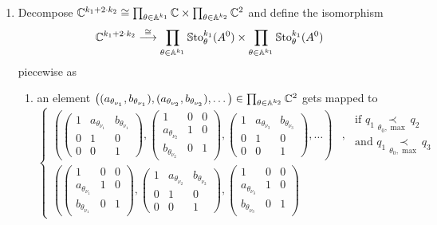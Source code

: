 \begin{enumerate}
  \item Decompose $\mathbb{C}^{k_1+2\cdot k_2}\cong
    \prod_{\theta\in\mathbb{A}^{k_1}} \mathbb{C} \times \prod_{\theta\in\mathbb{A}^{k_2}} \mathbb{C}^2$ and
    define the isomorphism
    \[
      \mathbb{C}^{k_1+2\cdot k_2}\overset{\cong}\longrightarrow
      \prod_{\theta\in\mathbb{A}^{k_1}} \operatorname{\mathbb{S}to}_{\theta}^{k_1}(A^0) \times
      \prod_{\theta\in\mathbb{A}^{k_1}} \operatorname{\mathbb{S}to}_{\theta}^{k_1}(A^0)
    \]
    piecewise as
    \begin{enumerate}
      \item an element
        $\left( (a_{\theta_{\nu_1}},b_{\theta_{\nu_1}})
          ,(a_{\theta_{\nu_2}},b_{\theta_{\nu_2}})
          ,\dots
        \right)\in\prod_{\theta\in\mathbb{A}^{k_2}} \mathbb{C}^2$
        gets mapped to
        \[
          \left.
          \begin{cases}
            \left(
            \begin{pmatrix} 1 & a_{\theta_{\nu_1}} & b_{\theta_{\nu_1}} \\0 & 1 & 0 \\0 & 0 & 1 \end{pmatrix}
            ,\begin{pmatrix} 1 & 0 & 0 \\a_{\theta_{\nu_2}} & 1 & 0 \\b_{\theta_{\nu_2}} & 0 & 1 \end{pmatrix}
            ,\begin{pmatrix} 1 & a_{\theta_{\nu_3}} & b_{\theta_{\nu_3}} \\0 & 1 & 0 \\0 & 0 & 1 \end{pmatrix}
              ,\dots
            \right)
            & ,\substack{\text{~if~} q_1 \underset{\theta_0,\max}{\prec} q_2
              \\\text{~and~} q_1 \underset{\theta_0,\max}{\prec} q_3}
            \\\left(
            \begin{pmatrix} 1 & 0 & 0 \\a_{\theta_{\nu_1}} & 1 & 0 \\b_{\theta_{\nu_1}} & 0 & 1 \end{pmatrix}
            ,\begin{pmatrix} 1 & a_{\theta_{\nu_2}} & b_{\theta_{\nu_2}} \\0 & 1 & 0 \\0 & 0 & 1 \end{pmatrix}
            ,\begin{pmatrix} 1 & 0 & 0 \\a_{\theta_{\nu_3}} & 1 & 0 \\b_{\theta_{\nu_3}} & 0 & 1 \end{pmatrix}

\end{cases}\]
\end{enumerate}
\end{enumerate}
